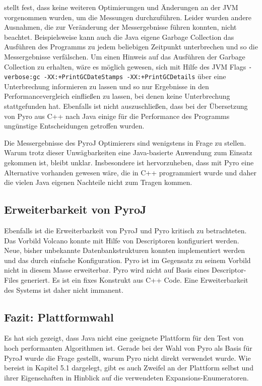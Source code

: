 \cite{shanbhag2014optimizing} stellt fest, dass keine weiteren Optimierungen und Änderungen an der JVM vorgenommen wurden, um die Messungen durchzuführen. Leider wurden andere Ausnahmen, die zur Veränderung der Messergebnisse führen konnten, nicht beachtet. Beispielsweise kann auch die Java eigene  Garbage Collection das Ausführen des Programms zu jedem beliebigen Zeitpunkt unterbrechen und so die Messergebnisse verfälschen. Um einen Hinweis auf das Ausführen der Garbage Collection zu erhalten, wäre es möglich gewesen, sich mit Hilfe des  JVM Flags \texttt{-verbose:gc -XX:+PrintGCDateStamps -XX:+PrintGCDetails} über eine Unterbrechung informieren zu lassen  \cite{andreasson2015JVM}  und so nur Ergebnisse in den Performancevergleich einfließen zu lassen, bei denen keine Unterbrechung stattgefunden hat. Ebenfalls ist nicht auszuschließen, dass bei der Übersetzung von Pyro aus C++ nach Java einige für die Performance des Programms ungünstige Entscheidungen getroffen wurden. 




Die Messergebnisse des PyroJ Optimierers sind wenigstens in Frage zu stellen. Warum trotz dieser Unwägbarkeiten eine Java-basierte Anwendung zum Einsatz gekommen ist, bleibt unklar. Insbesondere ist hervorzuheben, dass mit Pyro eine Alternative vorhanden gewesen wäre, die in C++ programmiert wurde und daher die vielen Java eigenen Nachteile nicht zum Tragen kommen. 


\subsection{Erweiterbarkeit von PyroJ}

Ebenfalls ist die Erweiterbarkeit von PyroJ und Pyro kritisch zu betrachteten. Das Vorbild Volcano konnte mit Hilfe von Descriptoren konfiguriert werden. Neue, bisher unbekannte Datenbankstrukturen konnten implementiert werden und das durch einfache Konfiguration. Pyro ist im Gegensatz zu seinem Vorbild nicht in diesem Masse erweiterbar. Pyro wird nicht auf Basis eines Descriptor-Files generiert. Es ist ein fixes Konstrukt aus C++ Code. Eine Erweiterbarkeit des Systems ist daher nicht immanent.


\subsection{Fazit: Plattformwahl}
Es hat sich gezeigt, dass Java nicht eine geeignete Plattform für den Test von hoch performanten Algorithmen ist. Gerade bei der Wahl von Pyro als Basis für PyroJ wurde die Frage gestellt, warum Pyro nicht direkt verwendet wurde. Wie bereist in Kapitel 5.1 dargelegt, gibt es auch Zweifel an der Plattform selbst und ihrer Eigenschaften in Hinblick auf die verwendeten Expansions-Enumeratoren.

